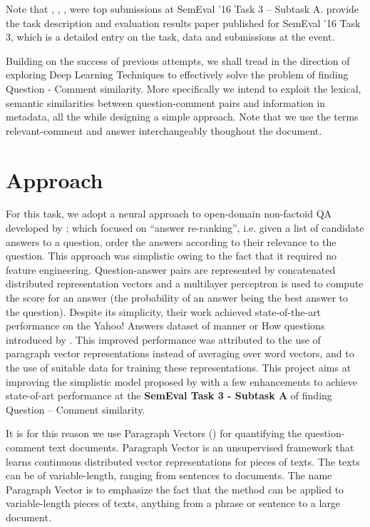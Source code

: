 \documentclass[12pt, a4paper, oneside]{Thesis} %
\newcommand{\mychapter}[2]{
    \setcounter{chapter}{#1}
    \setcounter{section}{0}
    \chapter*{#2}
    \addcontentsline{toc}{chapter}{#2}
    \lhead{\emph{#2}}
}
\begin{document}
Note that \cite{filice2016kelp}, \cite{joty2016convkn}, \cite{mihaylov2016semanticz}, \cite{mihaylova2016super} were top submissions at SemEval '16 Task 3 -- Subtask A. \cite{alessandromoschitti2016semeval} provide the task description and evaluation results paper published for SemEval '16 Task 3, which is a detailed entry on the task, data and submissions at the event.

Building on the success of previous attempts, we shall tread in the direction of exploring Deep Learning Techniques to effectively solve the problem of finding Question - Comment similarity. More specifically we intend to exploit the lexical, semantic similarities between question-comment pairs and information in metadata, all the while designing a simple approach. Note that we use the terms relevant-comment and answer interchangeably thoughout the document.



\mychapter{3}{Approach}
\label{chap:approach}

For this task, we adopt a neural approach to open-domain non-factoid QA developed by \cite{bogdanova2016we}; which focused on “answer re-ranking”, i.e. given a list of candidate answers to a question, order the answers according to their relevance to the question. This approach was simplistic owing to the fact that it required no feature engineering. Question-answer pairs are represented by concatenated distributed representation vectors and a multilayer perceptron is used to compute the score for an answer (the probability of an answer being the best answer to the question). Despite its simplicity, their work achieved state-of-the-art performance on the Yahoo! Answers dataset of manner or How questions introduced by \cite{jansen2014discourse}. This improved performance was attributed to the use of paragraph vector representations instead of averaging over word vectors, and to the use of suitable data for training these representations. This project aims at improving the simplistic model proposed by \cite{bogdanova2016we} with a few enhancements to achieve state-of-art performance at the \textbf{SemEval Task 3 - Subtask A} of finding Question -- Comment similarity.

It is for this reason we use Paragraph Vectors (\cite{le2014distributed}) for quantifying the question-comment text documents. Paragraph Vector is an unsupervised framework that learns continuous distributed vector representations for pieces of texts. The texts can be of variable-length, ranging from sentences to documents. The name Paragraph Vector is to emphasize the fact that the method can be applied to variable-length pieces of texts, anything from a phrase or sentence to a large document.
\end{document}
